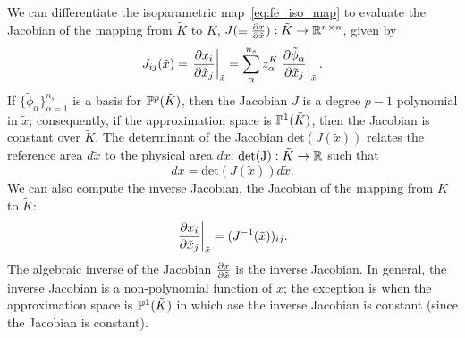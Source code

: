 We can differentiate the isoparametric map~\eqref{eq:fe_iso_map} to evaluate the Jacobian of the mapping from $\tilde K$ to $K$, $J (\equiv \frac{\partial x}{\partial \tilde x}): \tilde K \to \mathbb{R}^{n \times n}$, given by
\begin{equation*}
  J_{ij}(\tilde x)
  = \left. \frac{\partial x_i}{\partial \tilde x_j} \right|_{\tilde x}
  = \sum_{\alpha}^{n_s} z^K_\alpha \left. \frac{\partial \tilde \phi_\alpha}{\partial \tilde x_j} \right|_{\tilde x}.
\end{equation*}
If $\{\tilde \phi_\alpha\}_{\alpha=1}^{n_s}$ is a basis for $\mathbb{P}^p(\tilde K)$, then the Jacobian $J$ is a degree $p-1$ polynomial in $\tilde x$; consequently, if the approximation space is $\mathbb{P}^1(\tilde K)$, then the Jacobian is constant over $\tilde K$.  The determinant of the Jacobian $\text{det}(J(\tilde x))$ relates the reference area $d \tilde x$ to the physical area $dx$: $\text{det(J)}: \tilde K \to \mathbb{R}$ such that
\begin{equation*}
  dx = \text{det}(J(\tilde x)) d\tilde x.
\end{equation*}
We can also compute the inverse Jacobian, the Jacobian of the mapping from $K$ to $\tilde K$: 
\begin{equation*}
 \left. \frac{\partial x_i}{\partial \tilde x_j} \right|_{\tilde x} = (J^{-1}(\tilde x))_{ij}.
\end{equation*}
The algebraic inverse of the Jacobian $\frac{\partial x}{\partial \tilde x}$ is the inverse Jacobian.  In general, the inverse Jacobian is a non-polynomial function of $\tilde x$; the exception is when the approximation space is $\mathbb{P}^1(\tilde K)$ in which ase the inverse Jacobian is constant (since the Jacobian is constant).

